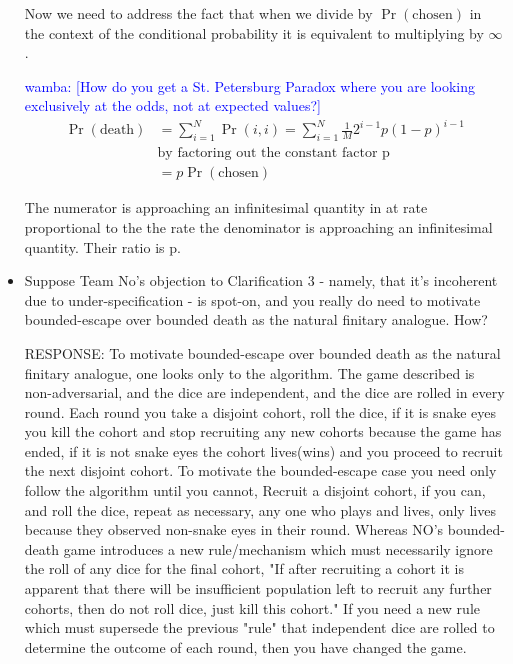 \documentclass[article,twocolumn]{memoir}
\newcommand{\wamba} [1]{\ifnum\Chatty=1 \textcolor{blue}{wamba:  [#1]} \fi}
\begin{document}
\begin{itemize}
{        Now we need to address the fact that when we divide by $\Pr(\text{chosen})$ in the context of the conditional probability it is equivalent to multiplying by $\infty$.

        \wamba{How do you get a St. Petersburg Paradox where you are looking exclusively at the odds, not at expected values?}
        \begin{align*}
            \Pr(\text{death})& = \sum_{i=1}^{N} \Pr(i,i)= \sum_{i=1}^{N} \tfrac{1}{M} 2^{i-1}p(1-p)^{i-1}\\
            & \text{by factoring out the constant factor p} \\
            & = p\Pr(\text{chosen})
        \end{align*}

        The numerator is approaching an infinitesimal quantity in at rate proportional to the the rate the denominator is approaching an infinitesimal quantity.  Their ratio is p.
    }
    
\item Suppose Team No’s objection to Clarification 3 - namely, that it’s incoherent due to under-specification - is spot-on, and you really do need to motivate bounded-escape over bounded death as the natural finitary analogue. How?

    {\color{violet}
        RESPONSE: 
        To motivate bounded-escape over bounded death as the natural finitary analogue, one looks only to the algorithm. The game described is non-adversarial, and the dice are independent, and the dice are rolled in every round.  Each round you take a disjoint cohort, roll the dice, if it is snake eyes you kill the cohort and stop recruiting any new cohorts because the game has ended, if it is not snake eyes the cohort lives(wins) and you proceed to recruit the next disjoint cohort.  To motivate the bounded-escape case you need only follow the algorithm until you cannot, Recruit a disjoint cohort, if you can, and roll the dice, repeat as necessary, any one who plays and lives, only lives because they observed non-snake eyes in their round. Whereas NO's bounded-death game introduces a new rule/mechanism which must necessarily ignore the roll of any dice for the final cohort, "If after recruiting a cohort it is apparent that there will be insufficient population left to recruit any further cohorts, then do not roll dice, just kill this cohort."  If you need a new rule which must supersede the previous "rule" that independent dice are rolled to determine the outcome of each round, then you have changed the game.  

}
\end{itemize}
\end{document}
